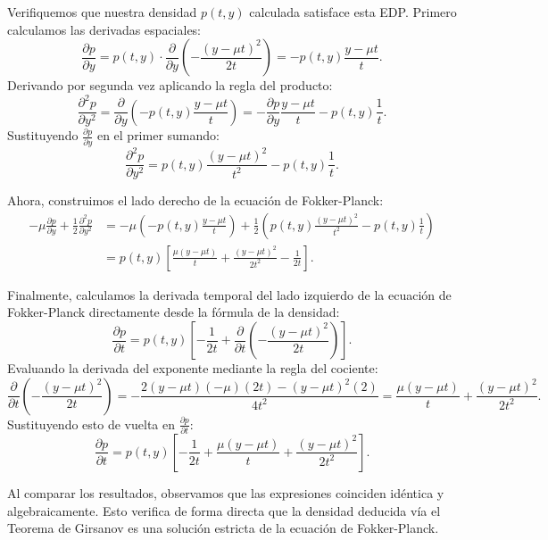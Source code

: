 \documentclass[11pt, letterpaper]{article}
\begin{document}
\begin{solucion}
    Verifiquemos que nuestra densidad $p(t, y)$ calculada satisface esta EDP. Primero calculamos las derivadas espaciales:
    \[ \frac{\partial p}{\partial y} = p(t,y) \cdot \frac{\partial}{\partial y}\left( -\frac{(y - \mu t)^2}{2t} \right) = -p(t,y) \frac{y - \mu t}{t}. \]
    Derivando por segunda vez aplicando la regla del producto:
    \[ \frac{\partial^2 p}{\partial y^2} = \frac{\partial}{\partial y}\left( -p(t,y) \frac{y - \mu t}{t} \right) = -\frac{\partial p}{\partial y} \frac{y - \mu t}{t} - p(t,y) \frac{1}{t}. \]
    Sustituyendo $\frac{\partial p}{\partial y}$ en el primer sumando:
    \[ \frac{\partial^2 p}{\partial y^2} = p(t,y) \frac{(y - \mu t)^2}{t^2} - p(t,y) \frac{1}{t}. \]
    
    Ahora, construimos el lado derecho de la ecuación de Fokker-Planck:
    \begin{align*}
        -\mu \frac{\partial p}{\partial y} + \frac{1}{2} \frac{\partial^2 p}{\partial y^2} &= -\mu \left( -p(t,y) \frac{y - \mu t}{t} \right) + \frac{1}{2} \left( p(t,y) \frac{(y - \mu t)^2}{t^2} - p(t,y) \frac{1}{t} \right) \\
        &= p(t,y) \left[ \frac{\mu(y - \mu t)}{t} + \frac{(y - \mu t)^2}{2t^2} - \frac{1}{2t} \right].
    \end{align*}
    
    Finalmente, calculamos la derivada temporal del lado izquierdo de la ecuación de Fokker-Planck directamente desde la fórmula de la densidad:
    \[ \frac{\partial p}{\partial t} = p(t,y) \left[ -\frac{1}{2t} + \frac{\partial}{\partial t}\left( -\frac{(y - \mu t)^2}{2t} \right) \right]. \]
    Evaluando la derivada del exponente mediante la regla del cociente:
    \[ \frac{\partial}{\partial t}\left( -\frac{(y - \mu t)^2}{2t} \right) = -\frac{2(y - \mu t)(-\mu)(2t) - (y - \mu t)^2(2)}{4t^2} = \frac{\mu(y - \mu t)}{t} + \frac{(y - \mu t)^2}{2t^2}. \]
    Sustituyendo esto de vuelta en $\frac{\partial p}{\partial t}$:
    \[ \frac{\partial p}{\partial t} = p(t,y) \left[ -\frac{1}{2t} + \frac{\mu(y - \mu t)}{t} + \frac{(y - \mu t)^2}{2t^2} \right]. \]
    
    Al comparar los resultados, observamos que las expresiones coinciden idéntica y algebraicamente. Esto verifica de forma directa que la densidad deducida vía el Teorema de Girsanov es una solución estricta de la ecuación de Fokker-Planck.
\end{solucion}

\newpage
\end{document}
